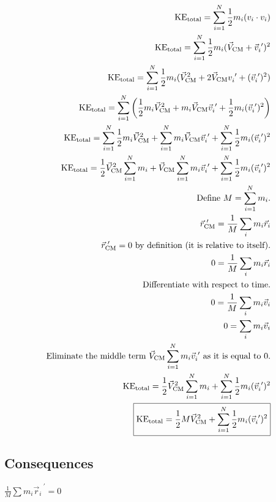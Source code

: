 \documentclass[letterpaper]{article}
\begin{document}
\begin{align*}
\text{KE}_\text{total} = \sum_{i=1}^N \frac{1}{2} m_i (v_i \cdot v_i) \\
\text{KE}_\text{total} =  \sum_{i=1}^N \frac{1}{2} m_i (\vec{V}_\text{CM} + \vec{v}_i^{\text{ }\prime})^2 \\
\text{KE}_\text{total} =  \sum_{i=1}^N \frac{1}{2} m_i (\vec{V}_\text{CM}^2 + 2\vec{V}_\text{CM}{v}_i^{\text{ }\prime} + (\vec{v}_i^{\text{ }\prime})^2) \\
\text{KE}_\text{total} =  \sum_{i=1}^N \left( \frac{1}{2} m_i \vec{V}_\text{CM}^2 + m_i \vec{V}_\text{CM}\vec{v}_i^{\text{ }\prime} + \frac{1}{2} m_i (\vec{v}_i^{\text{ }\prime})^2 \right) \\
\text{KE}_\text{total} =  \sum_{i=1}^N \frac{1}{2} m_i \vec{V}_\text{CM}^2 +  \sum_{i=1}^N  m_i \vec{V}_\text{CM}\vec{v}_i^{\text{ }\prime} + \sum_{i=1}^N \frac{1}{2} m_i  (\vec{v}_i^{\text{ }\prime})^2 \\
\text{KE}_\text{total} =  \frac{1}{2} \vec{V}_\text{CM}^2 \sum_{i=1}^N m_i  + \vec{V}_{\text{CM}} \sum_{i=1}^N  m_i \vec{v}_i^{\text{ }\prime}  + \sum_{i=1}^N \frac{1}{2} m_i  (\vec{v}_i^{\text{ }\prime})^2 \\
\text{Define $M = \sum_{i=1}^N  m_i$.} \\
\vec{r}_\text{CM}^{\text{ }\prime} = \frac{1}{M} \sum_i m_i \vec{r}_i \\
\text{$\vec{r}_\text{CM}^{\text{ }\prime} = 0$ by definition (it is relative to itself).} \\
0 = \frac{1}{M} \sum_i m_i \vec{r}_i \\
\text{Differentiate with respect to time.} \\
0 = \frac{1}{M} \sum_i m_i \vec{v}_i \\
0 = \sum_i m_i \vec{v}_i \\
\text{Eliminate the middle term $ \vec{V}_{\text{CM}} \sum_{i=1}^N  m_i \vec{v}_i^{\text{ }\prime}$ as it is equal to 0.} \\
\text{KE}_\text{total} =  \frac{1}{2} \vec{V}_\text{CM}^2 \sum_{i=1}^N m_i  + \sum_{i=1}^N \frac{1}{2} m_i  (\vec{v}_i^{\text{ }\prime})^2 \\
\boxed{\text{KE}_\text{total} =  \frac{1}{2} M \vec{V}_\text{CM}^2  + \sum_{i=1}^N \frac{1}{2} m_i  (\vec{v}_i^{\text{ }\prime})^2} \\
\end{align*} 



\subsection{Consequences}
\label{sec:orge17f19f}
\(\frac{1}{M} \sum m_i \vec{r}_i^{\text{ }\prime} = 0\)
\end{document}
